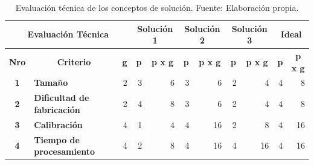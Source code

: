 \begin{table}[H]
	\centering
	\caption[Evaluación técnica de los conceptos de solución.]{Evaluación técnica de los conceptos de solución. Fuente: Elaboración propia.}
	\begin{tabular}{|c|c|c|c|c|c|c|c|c|c|c|}
		\hline
		\multicolumn{3}{|c|}{\textbf{Evaluación Técnica}} & \multicolumn{2}{c|}{\cellcolor[rgb]{ 1,  0,  0}\textcolor[rgb]{ 1,  1,  1}{\textbf{Solución 1}}} & \multicolumn{2}{c|}{\cellcolor[rgb]{ 0,  0,  1}\textcolor[rgb]{ 1,  1,  1}{\textbf{Solución 2}}} & \multicolumn{2}{c|}{\cellcolor[rgb]{ .298,  .835,  .078}\textbf{Solución 3}} & \multicolumn{2}{c|}{\cellcolor[rgb]{ 1,  .82,  .4}\textbf{Ideal}} \bigstrut\\
		\hline
		\textbf{Nro} & \textbf{Criterio} & \textbf{g} & \textbf{p} & \textbf{p x g} & \textbf{p} & \textbf{p x g} & \textbf{p} & \textbf{p x g} & \textbf{p} & \textbf{p x g} \bigstrut\\
		\hline
		\textbf{1} & \multicolumn{1}{l|}{\textbf{Tamaño}} & \multicolumn{1}{r|}{2} & \multicolumn{1}{r|}{\cellcolor[rgb]{ .949,  .863,  .859}3} & \multicolumn{1}{r|}{6} & \multicolumn{1}{r|}{\cellcolor[rgb]{ .863,  .902,  .945}3} & \multicolumn{1}{r|}{6} & \multicolumn{1}{r|}{\cellcolor[rgb]{ .922,  .945,  .871}2} & \multicolumn{1}{r|}{4} & \multicolumn{1}{r|}{\cellcolor[rgb]{ .992,  .914,  .851}4} & \multicolumn{1}{r|}{8} \bigstrut\\
		\hline
		\textbf{2} & \multicolumn{1}{l|}{\textbf{Dificultad de fabricación}} & \multicolumn{1}{r|}{2} & \multicolumn{1}{r|}{\cellcolor[rgb]{ .949,  .863,  .859}4} & \multicolumn{1}{r|}{8} & \multicolumn{1}{r|}{\cellcolor[rgb]{ .863,  .902,  .945}3} & \multicolumn{1}{r|}{6} & \multicolumn{1}{r|}{\cellcolor[rgb]{ .922,  .945,  .871}2} & \multicolumn{1}{r|}{4} & \multicolumn{1}{r|}{\cellcolor[rgb]{ .992,  .914,  .851}4} & \multicolumn{1}{r|}{8} \bigstrut\\
		\hline
		\textbf{3} & \multicolumn{1}{l|}{\textbf{Calibración}} & \multicolumn{1}{r|}{4} & \multicolumn{1}{r|}{\cellcolor[rgb]{ .949,  .863,  .859}1} & \multicolumn{1}{r|}{4} & \multicolumn{1}{r|}{\cellcolor[rgb]{ .863,  .902,  .945}4} & \multicolumn{1}{r|}{16} & \multicolumn{1}{r|}{\cellcolor[rgb]{ .922,  .945,  .871}2} & \multicolumn{1}{r|}{8} & \multicolumn{1}{r|}{\cellcolor[rgb]{ .992,  .914,  .851}4} & \multicolumn{1}{r|}{16} \bigstrut\\
		\hline
		\textbf{4} & \multicolumn{1}{l|}{\textbf{Tiempo de procesamiento}} & \multicolumn{1}{r|}{4} & \multicolumn{1}{r|}{\cellcolor[rgb]{ .949,  .863,  .859}2} & \multicolumn{1}{r|}{8} & \multicolumn{1}{r|}{\cellcolor[rgb]{ .863,  .902,  .945}4} & \multicolumn{1}{r|}{16} & \multicolumn{1}{r|}{\cellcolor[rgb]{ .922,  .945,  .871}4} & \multicolumn{1}{r|}{16} & \multicolumn{1}{r|}{\cellcolor[rgb]{ .992,  .914,  .851}4} & \multicolumn{1}{r|}{16} \bigstrut\\

\end{tabular}
\end{table}
